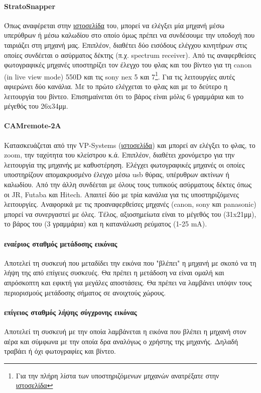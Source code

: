 \documentclass[a4paper, 12pt, twoside]{report}
\begin{document}
{{{{{{			\paragraph{StratoSnapper}{Όπως αναφέρεται στην \href{http://littlesmartthings.com/stratosnapper/}{ιστοσελίδα} του, μπορεί να ελέγξει μία μηχανή μέσω υπερύθρων ή μέσω καλωδίου στο οποίο όμως πρέπει να συνδέσουμε την υποδοχή που ταιριάζει στη μηχανή μας. Επιπλέον, διαθέτει δύο εισόδους ελέγχου κινητήρων στις οποίες συνδέεται ο ασύρματος δέκτης (π.χ. spectrum receiver). Από τις αναφερθείσες φωτογραφικές μηχανές υποστηρίζει τον έλεγχο του φλας και του βίντεο για τη canon (in live view mode) 550D και τις sony nex 5 και 7\footnote{Για την πλήρη λίστα των υποστηριζόμενων μηχανών ανατρέξατε στην \href{http://littlesmartthings.com/stratosnapper-supported-cameras/}{ιστοσελίδα}}. Για τις λειτουργίες αυτές αφιερώνει δύο κανάλια. Με το πρώτο ελέγχεται το φλας και με το δεύτερο η λειτουργία του βίντεο. Επισημαίνεται ότι το βάρος είναι μόλις 6 γραμμάρια και το μέγεθός του 26x34μμ.
			}
			\paragraph{CAMremote-2A}{Κατασκευάζεται από την VP-Systems (\href{http://vp-systems.eu/camremote.html}{ιστοσελίδα}) και μπορεί αν ελέγξει το φλας, το zoom, την ταχύτητα του κλείστρου κ.ά. Επιπλέον, διαθέτει χρονόμετρο για την λειτουργία της μηχανής με καθυστέρηση. Ελέγχει φωτογραφικές μηχανές οι οποίες υποστηρίζουν απομακρυσμένο έλεγχο μέσω usb θύρας, υπέρυθρων ακτίνων ή καλωδίου. Από την άλλη συνδέεται με όλους τους τυπικούς ασύρματους δέκτες όπως οι JR, Futaba και Hitech. Απαιτεί δύο με τρία κανάλια για τις υποστηριζόμενες λειτουργίες. Αναφορικά με τις προαναφερθείσες μηχανές (canon, sony και panasonic) μπορεί να συνεργαστεί με όλες. Τέλος, αξιοσημείωτα είναι το μέγεθός του (31x21μμ), το βάρος του (3 γραμμάρια) και η κατανάλωση ρεύματος (1-25 mA).
			}
			
			\paragraph{εναέριος σταθμός μετάδοσης εικόνας}{Αποτελεί τη συσκευή που μεταδίδει την εικόνα που "βλέπει" η μηχανή με σκοπό να τη λήψη της από επίγειες συσκευές. Θα πρέπει η μετάδοση να είναι ομαλή και απρόσκοπτη και εφικτή για μεγάλες αποστάσεις. Θα πρέπει να λαμβάνει υπόψιν τους περιορισμούς μετάδοσης σήματος σε ανοιχτούς χώρους.
			}
			
			
			\paragraph{επίγειος σταθμός λήψης σύγχρονης εικόνας}{Αποτελεί τη συσκευή με την οποία λαμβάνεται η εικόνα που βλέπει η μηχανή στον αέρα και σύμφωνα με την οποία δρα αναλόγως ο χρήστης της μηχανής. Δηλαδή τραβάει ή όχι φωτογραφίες και βίντεο.
			}
}}}}}}
\end{document}
